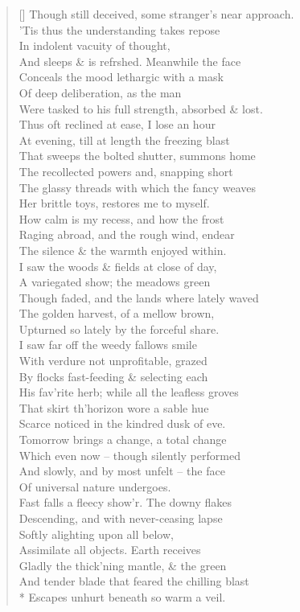 \documentclass[MAIN]{subfiles}
\begin{document}
\begin{verse}[\versewidth]
Though still deceived, some stranger's near approach.\\
'Tis thus the understanding takes repose\\
In indolent vacuity of thought,\\
And sleeps \& is refrshed. Meanwhile the face\\
Conceals the mood lethargic with a mask\\
Of deep deliberation, as the man\\
Were tasked to his full strength, absorbed \& lost.\\
Thus oft reclined at ease, I lose an hour\\
At evening, till at length the freezing blast\\
That sweeps the bolted shutter, summons home\\
The recollected powers and, snapping short\\
The glassy threads with which the fancy weaves\\
Her brittle toys, restores me to myself.\\
How calm is my recess, and how the frost\\
Raging abroad, and the rough wind, endear\\
The silence \& the warmth enjoyed within.\\
I saw the woods \& fields at close of day,\\
A variegated show; the meadows green\\
Though faded, and the lands where lately waved\\
The golden harvest, of a mellow brown,\\
Upturned so lately by the forceful share.\\
I saw far off the weedy fallows smile\\
With verdure not unprofitable, grazed\\
By flocks fast-feeding \& selecting each\\
His fav'rite herb; while all the leafless groves\\
That skirt th'horizon wore a sable hue\\
Scarce noticed in the kindred dusk of eve.\\
Tomorrow brings a change, a total change\\
Which even now -- though silently performed\\
And slowly, and by most unfelt -- the face\\
Of universal nature undergoes.\\
Fast falls a fleecy show'r. The downy flakes\\
Descending, and with never-ceasing lapse\\
Softly alighting upon all below,\\
Assimilate all objects. Earth receives\\
Gladly the thick'ning mantle, \& the green\\
And tender blade that feared the chilling blast\\*
Escapes unhurt beneath so warm a veil.
\end{verse}
\end{document}
